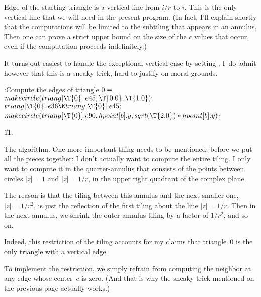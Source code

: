 Edge  of the starting triangle is a vertical line from
$i/r$ to $i$. This is the only vertical line that we will need in
the present program. (In fact, I'll explain shortly that
the computations will be limited to the subtiling that appears
in an annulus. Then one can prove
a strict upper bound on the size of the $c$ values that occur,
even if the computation proceeds indefinitely.)

It turns out easiest to handle the exceptional vertical case by
setting . I~do admit however that this is a sneaky
trick,
hard to justify on moral grounds.

\Y\B\4:Compute the edges of triangle 0\X${}\equiv{}$\6
$\\{makecircle}(\\{triang}[\T{0}].\\{e45},\39\T{0.0},\39\T{1.0});{}$\6
${}\\{triang}[\T{0}].\\{e36}\K\\{triang}[\T{0}].\\{e45};{}$\6
${}\\{makecircle}(\\{triang}[\T{0}].\\{e90},\39\\{hpoint}[\|b].\|y,\39\\{sqrt}(%
\T{2.0})*\\{hpoint}[\|b].\|y){}$;\par
\U11.\fi

The algorithm. One more important thing needs to be mentioned,
before we put all the pieces together: I don't actually
want to compute the entire tiling. I only want to compute it
in the quarter-annulus that consists of the points
between circles $\vert z\vert=1$ and $\vert z\vert=1/r$, in
the upper right quadrant of the complex plane.

The reason is that the tiling between this annulus and the
next-smaller one, $\vert z\vert=1/r^2$, is just the reflection
of the first tiling about the line $\vert z\vert=1/r$. Then in
the next annulus, we shrink the outer-annulus tiling by a factor
of $1/r^2$, and so on.

Indeed, this restriction of the tiling accounts for my claims that
triangle~0 is the only triangle with a vertical edge.

To implement the restriction, we simply refrain from computing
the neighbor at any edge whose center~$c$ is zero. (And
that is why the sneaky trick mentioned on the previous page
actually works.)


